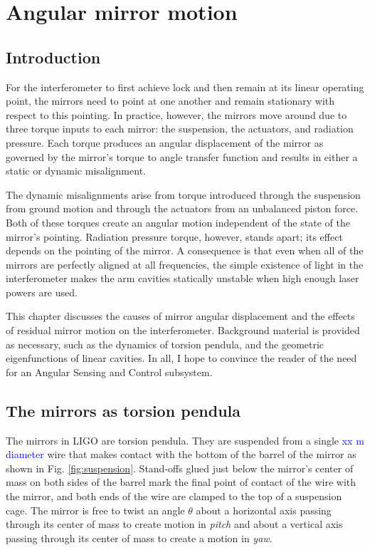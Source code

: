 \chapter{Angular mirror motion}

\section{Introduction}
For the interferometer to first achieve lock and then remain at its
linear operating point, the mirrors need to point at one another and
remain stationary with respect to this pointing. In practice, however,
the mirrors move around due to three torque inputs to each mirror: the
suspension, the actuators, and radiation pressure. Each torque
produces an angular displacement of the mirror as governed by the
mirror's torque to angle transfer function and results in either a
static or dynamic misalignment.

The dynamic misalignments arise from torque introduced through the
suspension from ground motion and through the actuators from an
unbalanced piston force. Both of these torques create an angular motion
independent of the state of the mirror's pointing. Radiation pressure
torque, however, stands apart; its effect depends on the pointing of
the mirror. A consequence is that even when all of the mirrors are
perfectly aligned at all frequencies, the simple existence of light in
the interferometer makes the arm cavities statically unstable when
high enough laser powers are used. 

This chapter discusses the causes of mirror angular displacement and
the effects of residual mirror motion on the
interferometer. Background material is provided as necessary, such as
the dynamics of torsion pendula, and the geometric eigenfunctions of
linear cavities. In all, I hope to convince the reader of the need for
an Angular Sensing and Control subsystem.





\section{The mirrors as torsion pendula}
The mirrors in LIGO are torsion pendula. They are suspended from a
single \textcolor{blue}{xx m diameter} wire that makes contact with
the bottom of the barrel of the mirror as shown in
Fig. \ref{fig:suspension}. Stand-offs glued just below the mirror's
center of mass on both sides of the barrel mark the final point of
contact of the wire with the mirror, and both ends of the wire are clamped
to the top of a suspension cage. The mirror is free to twist an angle
$\theta$ about a horizontal axis passing through its center of mass to
create motion in \emph{pitch} and about a vertical axis passing through its
center of mass to create a motion in \emph{yaw}. 

